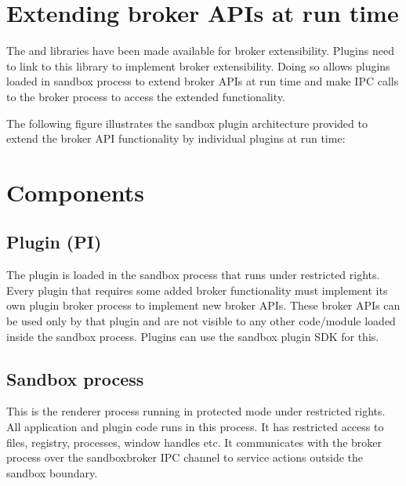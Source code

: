 \documentclass[letterpaper,12pt,english,openany,oneside]{sphinxmanual}
\begin{document}
\section{Extending broker APIs at run time}
\label{\detokenize{SandboxBrokerExt:extending-broker-apis-at-run-time}}
The  and  libraries have been made available for broker extensibility. Plugins need to link to this library to implement broker extensibility. Doing so allows plug\sphinxhyphen{}ins loaded in sandbox process to extend broker APIs at run time and make IPC calls to the broker process to access the extended functionality.

The following figure illustrates the sandbox plug\sphinxhyphen{}in architecture provided to extend the broker API functionality by individual plug\sphinxhyphen{}ins at run time:

\noindent{}


\section{Components}
\label{\detokenize{SandboxBrokerExt:components}}

\subsection{Plugin (PI)}
\label{\detokenize{SandboxBrokerExt:plugin-pi}}
The plug\sphinxhyphen{}in is loaded in the sandbox process that runs under restricted rights. Every plug\sphinxhyphen{}in that requires some added broker functionality must implement its own plug\sphinxhyphen{}in broker process to implement new broker APIs. These broker APIs can be used only by that plug\sphinxhyphen{}in and are not visible to any other code/module loaded inside the sandbox process. Plugins can use the sandbox plugin SDK for this.


\subsection{Sandbox process}
\label{\detokenize{SandboxBrokerExt:sandbox-process}}
This is the renderer process running in protected mode under restricted rights. All application and plug\sphinxhyphen{}in code runs in this process. It has restricted access to files, registry, processes, window handles etc. It communicates with the broker process over the sandbox\sphinxhyphen{}broker IPC channel to service actions outside the sandbox boundary.
\end{document}
